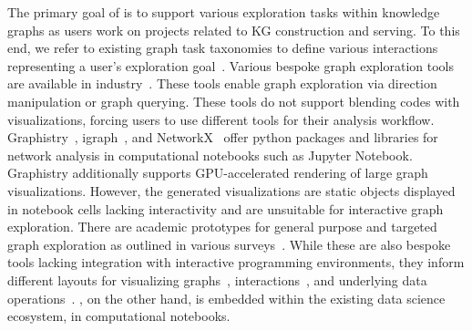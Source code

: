The primary goal of \system is to support various exploration tasks within knowledge graphs as users work on projects related to KG construction and serving. 
To this end, we refer to existing graph task taxonomies to define various interactions representing a user's exploration goal~\cite{pretorius2014tasks, kerracher2015task, ahn2013task, lee2006task}. 
Various bespoke graph exploration tools are available in industry~\cite{graphileon, graphistry, graphpolaris, graphxr, hume, linkurious, neobloom, neodash, yworks}. 
These tools enable graph exploration via direction manipulation or graph querying. These tools do not support blending codes with visualizations, forcing users to use different tools for their analysis workflow.
Graphistry~\cite{graphistry}, igraph~\cite{igraph}, and NetworkX~\cite{networkx} offer python packages and libraries for network analysis in computational notebooks such as Jupyter Notebook. Graphistry additionally supports GPU-accelerated rendering of large graph visualizations. However, the generated visualizations are static objects displayed in notebook cells lacking interactivity and are unsuitable for interactive graph exploration. 
There are academic prototypes for general purpose and targeted graph exploration as outlined in various surveys~\cite{pienta2015scalable,liu2018graph}. 
While these are also bespoke tools lacking integration with interactive programming environments, they inform different layouts for visualizing graphs~\cite{henry2007nodetrix, shneiderman2006network}, interactions~\cite{pienta2017facets, pienta2017vigor, chau2011apolo}, and underlying data operations~\cite{shen2006visual}. 
\system, on the other hand, is embedded within the existing data science ecosystem, \ie in computational notebooks. 




